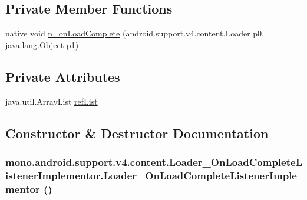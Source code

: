 \subsection*{Private Member Functions}
\begin{CompactItemize}
\item 
native void \hyperlink{classmono_1_1android_1_1support_1_1v4_1_1content_1_1_loader___on_load_complete_listener_implementor_3dcfc39c2d564be2fedf8b6a8e301261}{n\_\-onLoadComplete} (android.support.v4.content.Loader p0, java.lang.Object p1)
\end{CompactItemize}
\subsection*{Private Attributes}
\begin{CompactItemize}
\item 
java.util.ArrayList \hyperlink{classmono_1_1android_1_1support_1_1v4_1_1content_1_1_loader___on_load_complete_listener_implementor_6226d0b44e4a2bf969793881e5cb6a55}{refList}
\end{CompactItemize}


\subsection{Constructor \& Destructor Documentation}
\hypertarget{classmono_1_1android_1_1support_1_1v4_1_1content_1_1_loader___on_load_complete_listener_implementor_4cb694bdb85dfb2ef045e418d37b82d0}{
\subsubsection[{Loader\_\-OnLoadCompleteListenerImplementor}]{\setlength{\rightskip}{0pt plus 5cm}mono.android.support.v4.content.Loader\_\-OnLoadCompleteListenerImplementor.Loader\_\-OnLoadCompleteListenerImplementor ()}}
\label{classmono_1_1android_1_1support_1_1v4_1_1content_1_1_loader___on_load_complete_listener_implementor_4cb694bdb85dfb2ef045e418d37b82d0}




